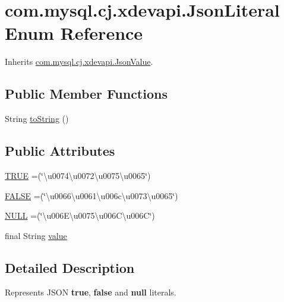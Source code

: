 \hypertarget{enumcom_1_1mysql_1_1cj_1_1xdevapi_1_1_json_literal}{}\section{com.\+mysql.\+cj.\+xdevapi.\+Json\+Literal Enum Reference}
\label{enumcom_1_1mysql_1_1cj_1_1xdevapi_1_1_json_literal}


Inherits \mbox{\hyperlink{interfacecom_1_1mysql_1_1cj_1_1xdevapi_1_1_json_value}{com.\+mysql.\+cj.\+xdevapi.\+Json\+Value}}.

\subsection*{Public Member Functions}
\begin{DoxyCompactItemize}
\item 
String \mbox{\hyperlink{enumcom_1_1mysql_1_1cj_1_1xdevapi_1_1_json_literal_a0e69ab344309afb640758d107a6ebccd}{to\+String}} ()
\end{DoxyCompactItemize}
\subsection*{Public Attributes}
\begin{DoxyCompactItemize}
\item 
\mbox{\hyperlink{enumcom_1_1mysql_1_1cj_1_1xdevapi_1_1_json_literal_a722be7500d3b4eaca0cff79a1d09b547}{T\+R\+UE}} =(\char`\"{}\textbackslash{}u0074\textbackslash{}u0072\textbackslash{}u0075\textbackslash{}u0065\char`\"{})
\item 
\mbox{\hyperlink{enumcom_1_1mysql_1_1cj_1_1xdevapi_1_1_json_literal_a916ec267d9278e15e933d8e9c63b7c00}{F\+A\+L\+SE}} =(\char`\"{}\textbackslash{}u0066\textbackslash{}u0061\textbackslash{}u006c\textbackslash{}u0073\textbackslash{}u0065\char`\"{})
\item 
\mbox{\hyperlink{enumcom_1_1mysql_1_1cj_1_1xdevapi_1_1_json_literal_ac7dcd6501113b4b9941a96fb4d91ae2c}{N\+U\+LL}} =(\char`\"{}\textbackslash{}u006\+E\textbackslash{}u0075\textbackslash{}u006\+C\textbackslash{}u006C\char`\"{})
\item 
final String \mbox{\hyperlink{enumcom_1_1mysql_1_1cj_1_1xdevapi_1_1_json_literal_a4faaa8c9c53810006badb212c2187575}{value}}
\end{DoxyCompactItemize}


\subsection{Detailed Description}
Represents J\+S\+ON {\bfseries true}, {\bfseries false} and {\bfseries null} literals. 

